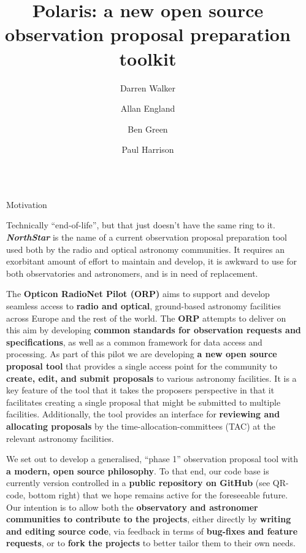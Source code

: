 \documentclass[final]{beamer}
\title{Polaris: a new open source observation proposal preparation toolkit}
\author{Darren Walker \and Allan England \and Ben Green \and Paul Harrison}
\institute[shortinst]{JBCA, The University of Manchester, UK}
\newlength{\sepwidth}
\newlength{\colwidth}
\newcommand{\separatorcolumn}{\begin{column}{\sepwidth}\end{column}}
\begin{document}
    \begin{frame}[t]
        \begin{columns}[t]
            \separatorcolumn

            \begin{column}{\colwidth}

                \begin{block}{Motivation}

                    Technically ``end-of-life'', but that just doesn't have the same ring to it.
                    \textbf{\emph{NorthStar}} is the name of a current observation proposal preparation tool used both
                    by the radio and optical astronomy communities.
                    It requires an exorbitant amount of effort to maintain and develop, it is awkward to use for both
                    observatories and astronomers, and is in need of replacement.

                    The \textbf{Opticon RadioNet Pilot (ORP)} aims to support and develop seamless access to
                    \textbf{radio and optical}, ground-based astronomy facilities across Europe and the rest of the
                    world.
                    The \textbf{ORP} attempts to deliver on this aim by developing \textbf{common standards for observation
                    requests and specifications}, as well as a common framework for data access and processing.
                    As part of this pilot we are developing \textbf{a new open source proposal tool} that provides a
                    single access point for the community to \textbf{create, edit, and submit proposals} to various
                    astronomy facilities. It is a key feature of the tool that it takes the proposers perspective in that it
                    facilitates creating a single proposal that might be submitted to multiple facilities.
                    Additionally, the tool provides an interface for \textbf{reviewing and allocating proposals} by the
                    time-allocation-committees (TAC) at the relevant astronomy facilities.

                    We set out to develop a generalised, ``phase 1'' observation proposal tool with
                    \textbf{a modern, open source philosophy}.
                    To that end, our code base is currently version controlled in a
                    \textbf{public repository on GitHub} (see QR-code, bottom right) that we hope remains active for
                    the foreseeable future.
                    Our intention is to allow both the
                    \textbf{observatory and astronomer communities to contribute to the projects},
                    either directly by \textbf{writing and editing source code}, via feedback in terms of
                    \textbf{bug-fixes and feature requests}, or to \textbf{fork the projects} to better tailor them to
                    their own needs.


\end{block}
\end{column}
\end{columns}
\end{frame}
\end{document}
